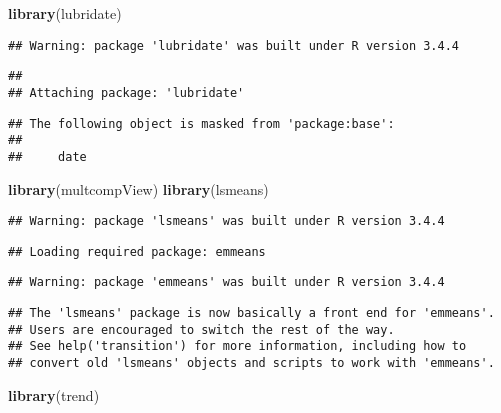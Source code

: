 \documentclass[]{article}
\newenvironment{Shaded}{\begin{snugshade}}{\end{snugshade}}
\newcommand{\KeywordTok}[1]{\textcolor[rgb]{0.13,0.29,0.53}{\textbf{#1}}}
\newcommand{\NormalTok}[1]{#1}
\begin{document}
\begin{Shaded}
\begin{Highlighting}[]
\KeywordTok{library}\NormalTok{(lubridate)}
\end{Highlighting}
\end{Shaded}

\begin{verbatim}
## Warning: package 'lubridate' was built under R version 3.4.4
\end{verbatim}

\begin{verbatim}
## 
## Attaching package: 'lubridate'
\end{verbatim}

\begin{verbatim}
## The following object is masked from 'package:base':
## 
##     date
\end{verbatim}

\begin{Shaded}
\begin{Highlighting}[]
\KeywordTok{library}\NormalTok{(multcompView)}
\KeywordTok{library}\NormalTok{(lsmeans)}
\end{Highlighting}
\end{Shaded}

\begin{verbatim}
## Warning: package 'lsmeans' was built under R version 3.4.4
\end{verbatim}

\begin{verbatim}
## Loading required package: emmeans
\end{verbatim}

\begin{verbatim}
## Warning: package 'emmeans' was built under R version 3.4.4
\end{verbatim}

\begin{verbatim}
## The 'lsmeans' package is now basically a front end for 'emmeans'.
## Users are encouraged to switch the rest of the way.
## See help('transition') for more information, including how to
## convert old 'lsmeans' objects and scripts to work with 'emmeans'.
\end{verbatim}

\begin{Shaded}
\begin{Highlighting}[]
\KeywordTok{library}\NormalTok{(trend)}
\end{Highlighting}
\end{Shaded}
\end{document}
